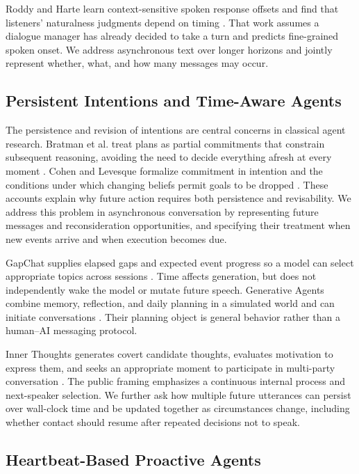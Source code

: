 \documentclass[manuscript,nonacm]{acmart}
\begin{document}
Roddy and Harte learn context-sensitive spoken response offsets and find that
listeners' naturalness judgments depend on timing \cite{roddy2020timings}. That
work assumes a dialogue manager has already decided to take a turn and predicts
fine-grained spoken onset. We address asynchronous text over longer horizons and
jointly represent whether, what, and how many messages may occur.

\subsection{Persistent Intentions and Time-Aware Agents}

The persistence and revision of intentions are central concerns in classical
agent research. Bratman et al. treat plans as partial commitments that constrain
subsequent reasoning, avoiding the need to decide everything afresh at every
moment \cite{bratman1988plans}. Cohen and Levesque formalize commitment in
intention and the conditions under which changing beliefs permit goals to be
dropped \cite{cohen1990intention}. These accounts explain why future action
requires both persistence and revisability. We address this problem in
asynchronous conversation by representing future messages and reconsideration
opportunities, and specifying their treatment when new events arrive and when
execution becomes due.

GapChat supplies elapsed gaps and expected event progress so a model can select
appropriate topics across sessions \cite{zhang2023gap}. Time affects generation,
but does not independently wake the model or mutate future speech. Generative
Agents combine memory, reflection, and daily planning in a simulated world and
can initiate conversations \cite{park2023generative}. Their planning object is
general behavior rather than a human--AI messaging protocol.

Inner Thoughts generates covert candidate thoughts, evaluates motivation to
express them, and seeks an
appropriate moment to participate in multi-party conversation
\cite{liu2025inner}. The public framing emphasizes a continuous internal process
and next-speaker selection. We further ask how multiple future utterances can
persist over wall-clock time and be updated together as circumstances change,
including whether contact should resume after repeated decisions not to speak.

\subsection{Heartbeat-Based Proactive Agents}
\end{document}
